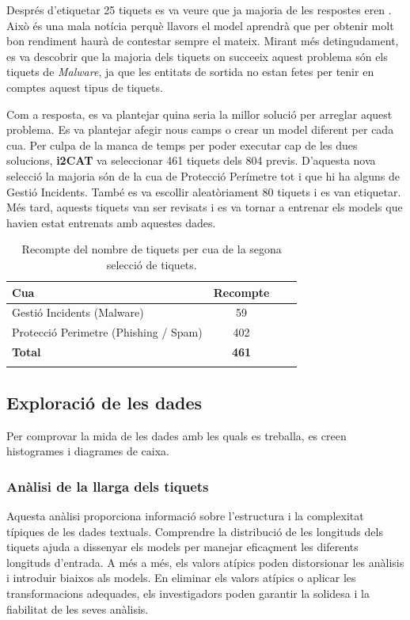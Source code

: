 Després d'etiquetar 25 tiquets es va veure que ja majoria de les respostes eren . Això és una mala notícia perquè llavors el model aprendrà que per obtenir molt bon rendiment haurà de contestar sempre el mateix. Mirant més detingudament, es va descobrir que la majoria dels tiquets on succeeix aquest problema són els tiquets de \textit{Malware}, ja que les entitats de sortida no estan fetes per tenir en comptes aquest tipus de tiquets.

Com a resposta, es va plantejar quina seria la millor solució per arreglar aquest problema. Es va plantejar afegir nous camps o crear un model diferent per cada cua. Per culpa de la manca de temps per poder executar cap de les dues solucions, \textbf{i2CAT} va seleccionar 461 tiquets dels 804 previs. D'aquesta nova selecció la majoria són de la cua de Protecció Perímetre tot i que hi ha alguns de Gestió Incidents. També es va escollir aleatòriament 80 tiquets i es van etiquetar. Més tard, aquests tiquets van ser revisats i es va tornar a entrenar els models que havien estat entrenats amb aquestes dades.

\begin{table}[H]
  \centering
  \begin{tabular}{lccr}
      \Xhline{2\arrayrulewidth}
      \textbf{Cua} & \textbf{Recompte} \\
      \hline
      Gestió Incidents (Malware) & 59 \\
      Protecció Perimetre (Phishing / Spam) & 402  \\
      \hline
      \textbf{Total} & \textbf{461} \\
      \Xhline{2\arrayrulewidth}
  \end{tabular}
  \caption{Recompte del nombre de tiquets per cua de la segona selecció de tiquets.}
  \label{tab:recompte_per_cua_2}
\end{table}





\subsection{Exploració de les dades}
Per comprovar la mida de les dades amb les quals es treballa, es creen histogrames i diagrames de caixa.

\subsubsection{Anàlisi de la llarga dels tiquets}
Aquesta anàlisi proporciona informació sobre l'estructura i la complexitat típiques de les dades textuals. Comprendre la distribució de les longituds dels tiquets ajuda a dissenyar els models per manejar eficaçment les diferents longituds d'entrada. A més a més, els valors atípics poden distorsionar les anàlisis i introduir biaixos als models. En eliminar els valors atípics o aplicar les transformacions adequades, els investigadors poden garantir la solidesa i la fiabilitat de les seves anàlisis.

